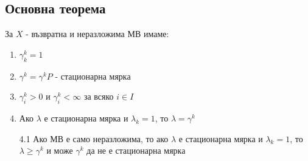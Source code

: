 \documentclass{article}
\begin{document}
\subsection{Основна теорема}
За $X$ - възвратна и неразложима МВ имаме:
\begin{enumerate}
\item $\gamma_k^k = 1$
\item $\gamma^k = \gamma^k P$ - стационарна мярка
\item $\gamma_i^k > 0$ и $\gamma_i^k < \infty$ за всяко $i \in I$
\item Ако $\lambda$ е стационарна мярка и $\lambda_k = 1$, то $\lambda = \gamma^k$
\item[4.1] Ако МВ е само неразложима, то ако $\lambda$ е стационарна мярка и $\lambda_k = 1$, то $\lambda \geq \gamma^k$ и може $\gamma^k$ да не е стационарна мярка
\end{enumerate}
\end{document}
